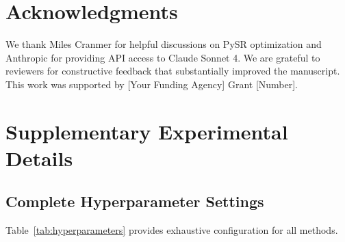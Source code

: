 \section*{Acknowledgments}

We thank Miles Cranmer for helpful discussions on PySR optimization and Anthropic for providing API access to Claude Sonnet 4. We are grateful to reviewers for constructive feedback that substantially improved the manuscript. This work was supported by [Your Funding Agency] Grant [Number].

\appendix

\section{Supplementary Experimental Details}
\label{app:experiments}

\subsection{Complete Hyperparameter Settings}

Table~\ref{tab:hyperparameters} provides exhaustive configuration for all methods.

